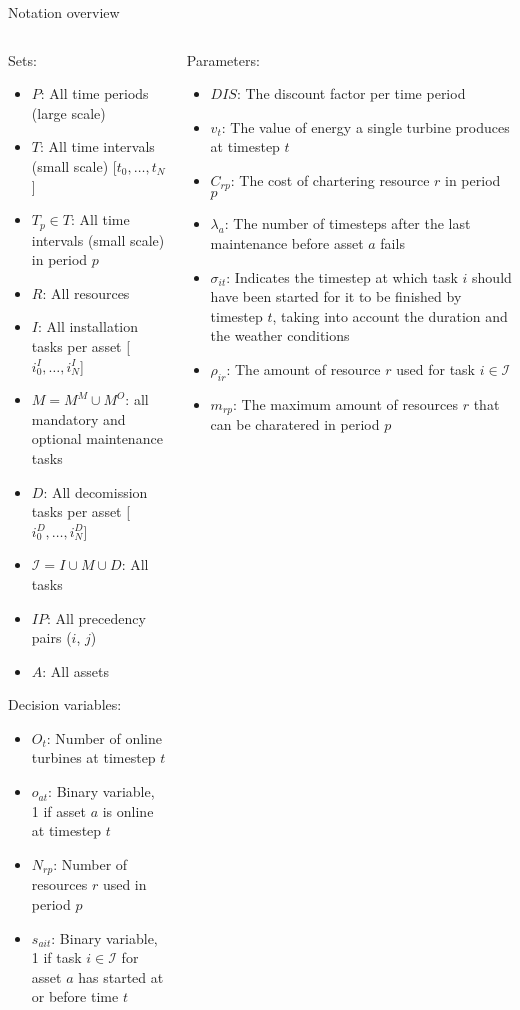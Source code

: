 \documentclass{beamer}
\begin{document}
\begin{frame}{Notation overview}
\tiny

\begin{columns}
\begin{column}{.48\textwidth}
Sets:
\begin{itemize}
\item $P$: All time periods (large scale)
\item $T$: All time intervals (small scale) [$t_0, \dots , t_N$]
\item $T_p \in T$: All time intervals (small scale) in period $p$
\item $R$: All resources
\item $I$: All installation tasks per asset [$i^I_0, \dots , i^I_N$]
\item $M = M^M \cup M^O$: all mandatory and optional maintenance tasks
\item $D$: All decomission tasks per asset [$i^D_0, \dots , i^D_N$]
\item $\mathcal{I} = I \cup M \cup D$: All tasks
\item $IP$: All precedency pairs ($i$, $j$)
\item $A$: All assets
\end{itemize}

Decision variables:
\begin{itemize}
\item $O_{t}$: Number of online turbines at timestep $t$
\item $o_{at}$: Binary variable, 1 if asset $a$ is online at timestep $t$
\item $N_{rp}$: Number of resources $r$ used in period $p$
\item $s_{ait}$: Binary variable, 1 if task $i \in \mathcal{I}$ for asset $a$ has started at or before time $t$
\end{itemize}
\end{column}

\hfill

\begin{column}{.48\textwidth}
Parameters:
\begin{itemize}
\item $DIS$: The discount factor per time period
\item $v_t$: The value of energy a single turbine produces at timestep $t$
\item $C_{rp}$: The cost of chartering resource $r$ in period $p$
\item $\lambda_a$: The number of timesteps after the last maintenance before asset $a$ fails
\item $\sigma_{it}$: Indicates the timestep at which task $i$ should have been started for it to be finished by timestep $t$, taking into account the duration and the weather conditions
\item $\rho_{ir}$: The amount of resource $r$ used for task $i \in \mathcal{I}$
\item $m_{rp}$: The maximum amount of resources $r$ that can be charatered in period $p$
\end{itemize}
\end{column}
\end{columns}

\end{frame}
\end{document}

